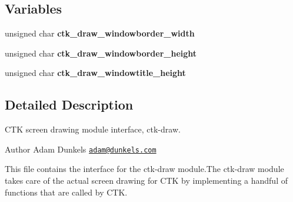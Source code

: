\subsection*{Variables}
\begin{DoxyCompactItemize}
\item 
\hypertarget{group__ctkdraw_ga9e116d894f9f5823092910e77b8224e0}{}unsigned char {\bfseries ctk\+\_\+draw\+\_\+windowborder\+\_\+width}\label{group__ctkdraw_ga9e116d894f9f5823092910e77b8224e0}

\item 
\hypertarget{group__ctkdraw_ga90e742edc8b359a73f02699c84d921e2}{}unsigned char {\bfseries ctk\+\_\+draw\+\_\+windowborder\+\_\+height}\label{group__ctkdraw_ga90e742edc8b359a73f02699c84d921e2}

\item 
\hypertarget{group__ctkdraw_ga60d13ead987fe40807293206478b207f}{}unsigned char {\bfseries ctk\+\_\+draw\+\_\+windowtitle\+\_\+height}\label{group__ctkdraw_ga60d13ead987fe40807293206478b207f}

\end{DoxyCompactItemize}


\subsection{Detailed Description}
C\+T\+K screen drawing module interface, ctk-\/draw. \begin{DoxyAuthor}{Author}
Adam Dunkels \href{mailto:adam@dunkels.com}{\tt adam@dunkels.\+com}
\end{DoxyAuthor}
This file contains the interface for the ctk-\/draw module.\+The ctk-\/draw module takes care of the actual screen drawing for C\+T\+K by implementing a handful of functions that are called by C\+T\+K. 